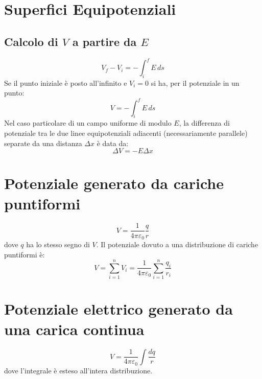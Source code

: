         \section*{Superfici Equipotenziali}
            \subsection*{Calcolo di $V$ a partire da $E$}
                \begin{equation*}
                    V_f - V_i = - \int_{i}^{f} E \,ds
                \end{equation*}
            Se il punto iniziale è posto all'infinito e $V_i = 0$ si ha, per il
            potenziale in un punto:
                \begin{equation*}
                    V = -\int_{i}^{f} E \,ds
                \end{equation*}
            Nel caso particolare di un campo uniforme di modulo $E$, la 
            differenza di potenziale tra le due linee equipotenziali adiacenti
            (necessariamente parallele) separate da una distanza $\Delta x$ è 
            data da:
                \begin{equation*}
                    \Delta V = -E\Delta x
                \end{equation*}

        \section*{Potenziale generato da cariche puntiformi}
            \begin{equation*}
                V = \frac{1}{4\pi\varepsilon_0}\frac{q}{r}
            \end{equation*}
        dove $q$ ha lo stesso segno di $V$. Il potenziale dovuto a una 
        distribuzione di cariche puntiformi è:
            \begin{equation*}
                V = \sum_{i = 1}^{n}V_i = \frac{1}{4\pi\varepsilon_0}
                \sum_{i = 1}^{n}\frac{q_i}{r_i}
            \end{equation*}

        \section*{Potenziale elettrico generato da una carica continua}
            \begin{equation*}
                V = \frac{1}{4\pi\varepsilon_0}\int \frac{dq}{r}
            \end{equation*}
        dove l'integrale è esteso all'intera distribuzione.

